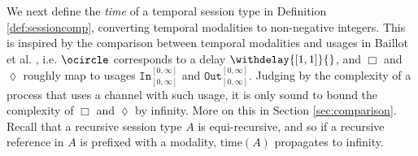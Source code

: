 We next define the \textit{time} of a temporal session type in Definition \ref{def:sessioncomp}, converting temporal modalities to non-negative integers. This is inspired by the comparison between temporal modalities and usages in Baillot et al. \cite{BaillotEtAl2021}, i.e. $\ocircle$ corresponds to a delay $\withdelay{[1,1]}{}$, and $\Box$ and $\lozenge$ roughly map to usages $\texttt{In}^{[0,\infty]}_{[0,\infty]}$ and $\texttt{Out}^{[0,\infty]}_{[0,\infty]}$. Judging by the complexity of a process that uses a channel with such usage, it is only sound to bound the complexity of $\Box$ and $\lozenge$ by infinity. More on this in Section \ref{sec:comparison}. Recall that a recursive session type $A$ is equi-recursive, and so if a recursive reference in $A$ is prefixed with a modality, $\text{time}(A)$ propagates to infinity.

